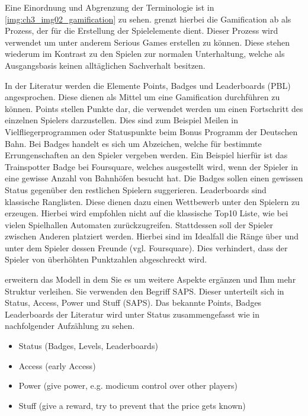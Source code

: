 Eine Einordnung und Abgrenzung der Terminologie ist in \ref{img:ch3_img02_gamification} zu sehen. \textcite{Deterding.2011} grenzt hierbei die Gamification ab als Prozess, der für die Erstellung der Spielelemente dient. Dieser Prozess wird verwendet um unter anderem Serious Games erstellen zu können. Diese stehen wiederum im Kontrast zu den Spielen zur normalen Unterhaltung, welche als Ausgangsbasis keinen alltäglichen Sachverhalt besitzen.

In der Literatur werden die Elemente Points, Badges und Leaderboards (PBL) angesprochen. Diese dienen als Mittel um eine Gamification durchführen zu können. 
Points stellen Punkte dar, die verwendet werden um einen Fortschritt des einzelnen Spielers darzustellen. Dies sind zum Beispiel Meilen in Vielfliegerprogrammen oder Statuspunkte beim Bonus Programm der Deutschen Bahn.
Bei Badges handelt es sich um Abzeichen, welche für bestimmte Errungenschaften an den Spieler vergeben werden. Ein Beispiel hierfür ist das Trainspotter Badge bei Foursquare, welches ausgestellt wird, wenn der Spieler in eine gewisse Anzahl von Bahnhöfen besucht hat. Die Badges sollen einen gewissen Status gegenüber den restlichen Spielern suggerieren.
Leaderboards sind klassische Ranglisten. Diese dienen dazu einen Wettbewerb unter den Spielern zu erzeugen. Hierbei wird empfohlen nicht auf die klassische Top10 Liste, wie bei vielen Spielhallen Automaten zurückzugreifen. Stattdessen soll der Spieler zwischen Anderen platziert werden. Hierbei sind im Idealfall die Ränge über und unter dem Spieler dessen Freunde (vgl. Foursquare). Dies verhindert, dass der Spieler von überhöhten Punktzahlen abgeschreckt wird.

\textcite{Zichermann.2011} erweitern das Modell in dem Sie es um weitere Aspekte ergänzen und Ihm mehr Struktur verleihen.
Sie verwenden den Begriff SAPS. Dieser unterteilt sich in Status, Access, Power und Stuff (SAPS).
Das bekannte Points, Badges Leaderboards der Literatur wird unter Status zusammengefasst wie in nachfolgender Aufzählung zu sehen.

\begin{itemize}
\item Status (Badges, Levels, Leaderboards)
\item Access (early Access)
\item Power (give power, e.g. modicum control over other players)
\item Stuff (give a reward, try to prevent that the price gets known)
\end{itemize}

